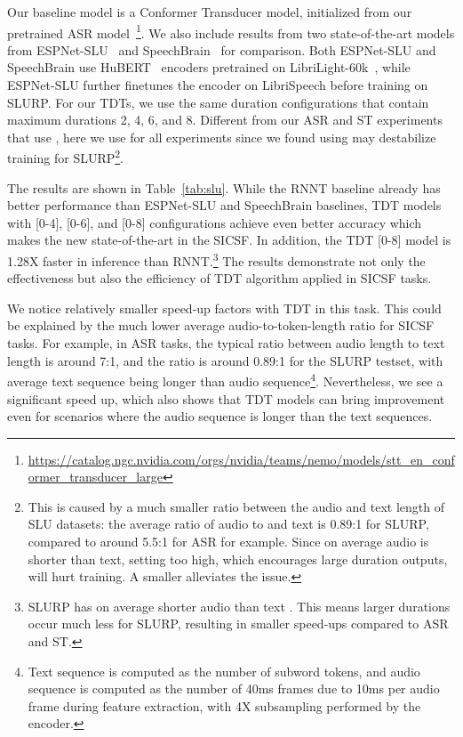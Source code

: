 \documentclass{article}
\begin{document}
Our baseline model is a Conformer Transducer model, initialized from our pretrained ASR model~\footnote{\url{https://catalog.ngc.nvidia.com/orgs/nvidia/teams/nemo/models/stt_en_conformer_transducer_large}}. 
We also include results from two state-of-the-art models from ESPNet-SLU~\cite{arora2022espnet} and SpeechBrain~\cite{wang2021fine} for comparison. Both ESPNet-SLU  and SpeechBrain  use HuBERT~\cite{hsu2021hubert} encoders pretrained on LibriLight-60k~\cite{kahn2020librilight}, while ESPNet-SLU further finetunes the encoder on LibriSpeech before training on SLURP. 
For our TDTs, we use the same duration configurations that contain maximum durations 2, 4, 6, and 8. Different from our ASR and ST experiments that use , here we use  for all experiments since we found using  may destabilize training for SLURP\footnote{This is caused by a much smaller ratio between the audio and text length of SLU datasets: the average ratio of audio to and text is 0.89:1 for SLURP, compared to around 5.5:1 for ASR for example. Since on average audio is shorter than text, setting  too high, which encourages large duration outputs, will hurt training. A smaller   alleviates the issue.}. 

The results are shown in Table~\ref{tab:slu}. While the RNNT baseline already has better performance than ESPNet-SLU and SpeechBrain baselines,  TDT models with [0-4], [0-6], and [0-8] configurations achieve even better accuracy which makes the new state-of-the-art in the SICSF. In addition, the TDT [0-8] model is 1.28X faster in inference  than RNNT.\footnote{SLURP has on average shorter audio than text 
. This means larger durations occur much less for SLURP, resulting in smaller speed-ups compared to ASR and ST.}
The results demonstrate not only the effectiveness but also the efficiency of TDT algorithm applied in SICSF tasks. 

We notice relatively smaller speed-up factors with TDT in this task. This could be explained by the much lower average audio-to-token-length ratio for SICSF tasks. For example, in ASR tasks, the typical ratio between audio length to text length is around 7:1, and the ratio is around 0.89:1 for the SLURP testset, with average text sequence being longer than audio sequence\footnote{Text sequence is computed as the number of subword tokens, and audio sequence is computed as the number of 40ms frames due to 10ms per audio frame during feature extraction, with 4X subsampling performed by the encoder.}. Nevertheless, we see a significant speed up, which also shows that TDT models can bring improvement even for scenarios where the audio sequence is longer than the text sequences. 
\end{document}
